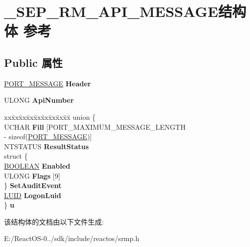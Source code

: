 \hypertarget{struct___s_e_p___r_m___a_p_i___m_e_s_s_a_g_e}{}\section{\+\_\+\+S\+E\+P\+\_\+\+R\+M\+\_\+\+A\+P\+I\+\_\+\+M\+E\+S\+S\+A\+G\+E结构体 参考}
\label{struct___s_e_p___r_m___a_p_i___m_e_s_s_a_g_e}
\subsection*{Public 属性}
\begin{DoxyCompactItemize}
\item 
\mbox{\label{struct___s_e_p___r_m___a_p_i___m_e_s_s_a_g_e_adedf89e9b7f82afabd1a265595d00dae}} 
\hyperlink{struct___p_o_r_t___m_e_s_s_a_g_e___h_e_a_d_e_r}{P\+O\+R\+T\+\_\+\+M\+E\+S\+S\+A\+GE} {\bfseries Header}
\item 
\mbox{\label{struct___s_e_p___r_m___a_p_i___m_e_s_s_a_g_e_aae05772539007bdfa63b2cba2206c494}} 
U\+L\+O\+NG {\bfseries Api\+Number}
\item 
\mbox{\label{struct___s_e_p___r_m___a_p_i___m_e_s_s_a_g_e_a96edede96bbddb412bd4f7841f18a0ed}} 
\begin{tabbing}
xx\=xx\=xx\=xx\=xx\=xx\=xx\=xx\=xx\=\kill
union \{\\
\>UCHAR {\bfseries Fill} \mbox{[}PORT\_MAXIMUM\_MESSAGE\_LENGTH \\
\>\>-\/ sizeof(\hyperlink{struct___p_o_r_t___m_e_s_s_a_g_e___h_e_a_d_e_r}{PORT\_MESSAGE})\mbox{]}\\
\>NTSTATUS {\bfseries ResultStatus}\\
\>struct \{\\
\>\>\hyperlink{_processor_bind_8h_a112e3146cb38b6ee95e64d85842e380a}{BOOLEAN} {\bfseries Enabled}\\
\>\>ULONG {\bfseries Flags} \mbox{[}9\mbox{]}\\
\>\} {\bfseries SetAuditEvent}\\
\>\hyperlink{struct___l_u_i_d}{LUID} {\bfseries LogonLuid}\\
\} {\bfseries u}\\

\end{tabbing}\end{DoxyCompactItemize}


该结构体的文档由以下文件生成\+:\begin{DoxyCompactItemize}
\item 
E\+:/\+React\+O\+S-\/0../sdk/include/reactos/srmp.\+h\end{DoxyCompactItemize}
